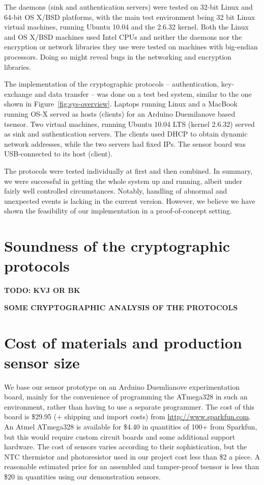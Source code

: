 The daemons (sink and authentication servers) were tested on 32-bit Linux and 64-bit OS X/BSD platforms, with the main test environment being 32 bit Linux virtual machines, running Ubuntu 10.04 and the 2.6.32 kernel. Both the Linux and OS X/BSD machines used Intel CPUs and neither the daemons nor the encryption or network libraries they use were tested on machines with big-endian processors. Doing so might reveal bugs in the networking and encryption libraries. 

The implementation of the cryptographic protocols -- authentication, key-exchange and data transfer -- was done on a test bed system, similar to the one shown in Figure~\ref{fig:sys-overview}. Laptops running Linux and a MacBook running OS-X served as hosts (clients) for an Arduino Duemilanove based tsensor. Two virtual machines, running Ubuntu 10.04 LTS (kernel 2.6.32) served as sink and authentication servers. The clients used DHCP to obtain dynamic network addresses, while the two servers had fixed IPs. The sensor board was USB-connected to its host (client).

The protocols were tested individually at first and then combined. In summary, we were successful in getting the whole system up and running, albeit under fairly well controlled circumstances. Notably, handling of abnormal and unexpected events is lacking in the current version. However, we believe we have shown the feasibility of our implementation in a proof-of-concept setting.

\section{Soundness of the cryptographic protocols}
\label{sec:crypto-protocol-analysis}

\textbf{TODO: KVJ OR BK}

\textbf{SOME CRYPTOGRAPHIC ANALYSIS OF THE PROTOCOLS}

\section{Cost of materials and production sensor size}

We base our sensor prototype on an Arduino Duemlianove experimentation board, mainly for the convenience of programming the ATmega328 in such an environment, rather than having to use a separate programmer. The cost of this board is \$29.95 (+ shipping and import costs) from \url{http://www.sparkfun.com}. An Atmel ATmega328 is available for \$4.40 in quantities of 100+ from Sparkfun, but this would require custom circuit boards and some additional support hardware. The cost of sensors varies according to their sophistication, but the NTC thermistor and photoresistor used in our project cost less than \$2 a piece. A reasonable estimated price for an assembled and tamper-proof tsensor is less than \$20 in quantities using our demonstration sensors. 

